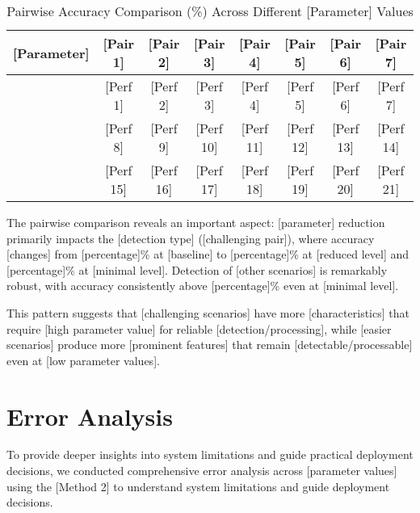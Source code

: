 \begin{table}[htbp]
\caption{Pairwise Accuracy Comparison (\%) Across Different [Parameter] Values}
\label{tab:pairwise_parameter}
\begin{tabular}{|l|c|c|c|c|c|c|c|}
\hline
\textbf{[Parameter]} & \textbf{[Pair 1]} & \textbf{[Pair 2]} & \textbf{[Pair 3]} & \textbf{[Pair 4]} & \textbf{[Pair 5]} & \textbf{[Pair 6]} & \textbf{[Pair 7]} \\
\hline
[Value 1] & [Perf 1] & [Perf 2] & [Perf 3] & [Perf 4] & [Perf 5] & [Perf 6] & [Perf 7] \\
\hline
[Value 2] & [Perf 8] & [Perf 9] & [Perf 10] & [Perf 11] & [Perf 12] & [Perf 13] & [Perf 14] \\
\hline
[Value 3] & [Perf 15] & [Perf 16] & [Perf 17] & [Perf 18] & [Perf 19] & [Perf 20] & [Perf 21] \\
\hline
\end{tabular}
\end{table}

The pairwise comparison reveals an important aspect: [parameter] reduction primarily impacts the [detection type] ([challenging pair]), where accuracy [changes] from [percentage]\% at [baseline] to [percentage]\% at [reduced level] and [percentage]\% at [minimal level]. Detection of [other scenarios] is remarkably robust, with accuracy consistently above [percentage]\% even at [minimal level].

This pattern suggests that [challenging scenarios] have more [characteristics] that require [high parameter value] for reliable [detection/processing], while [easier scenarios] produce more [prominent features] that remain [detectable/processable] even at [low parameter values].

\section{Error Analysis}

To provide deeper insights into system limitations and guide practical deployment decisions, we conducted comprehensive error analysis across [parameter values] using the [Method 2] to understand system limitations and guide deployment decisions. 


